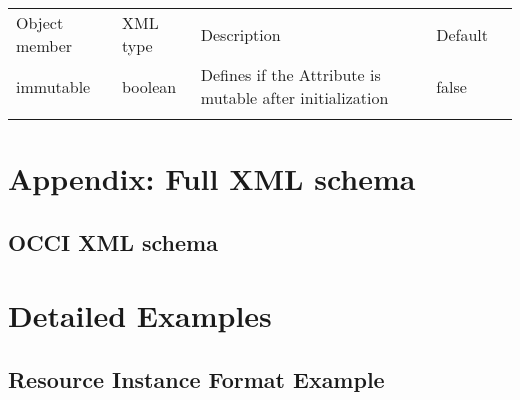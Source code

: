 \documentclass[10pt,a4paper]{article}
\begin{document}
 {
    \begin{tabularx}{\textwidth}{llXll}
    \toprule
    Object member & XML type & Description & Default \\
    \colrule
    immutable & boolean & Defines if the Attribute is mutable after initialization
& false \\


    \botrule
    \end{tabularx}
}

\section{Appendix: Full XML schema}
\label{sec:full_xml_schema}

\subsection{OCCI XML schema}
\label{sec:occi_xml_schema}



\section{Detailed Examples}
\label{sec:examples}


\subsection{Resource Instance Format Example}
\label{sec:example_resource}
\end{document}
